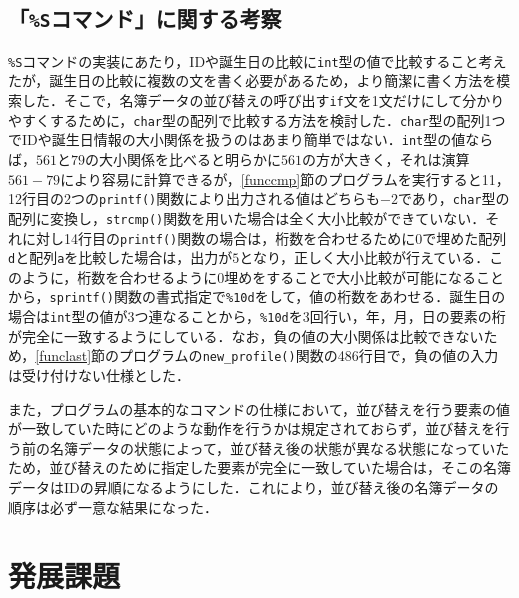 \subsection{「\texttt{\%S}コマンド」に関する考察}

\verb|%S|コマンドの実装にあたり，IDや誕生日の比較に\verb|int|型の値で比較すること考えたが，誕生日の比較に複数の文を書く必要があるため，より簡潔に書く方法を模索した．そこで，名簿データの並び替えの呼び出す\verb|if|文を1文だけにして分かりやすくするために，\verb|char|型の配列で比較する方法を検討した．\verb|char|型の配列1つでIDや誕生日情報の大小関係を扱うのはあまり簡単ではない．\verb|int|型の値ならば，$561$と$79$の大小関係を比べると明らかに$561$の方が大きく，それは演算$561 - 79$により容易に計算できるが，\ref{funccmp}節のプログラムを実行すると11，12行目の2つの\verb|printf()|関数により出力される値はどちらも$-2$であり，\verb|char|型の配列に変換し，\verb|strcmp()|関数を用いた場合は全く大小比較ができていない．それに対し14行目の\verb|printf()|関数の場合は，桁数を合わせるために0で埋めた配列\verb|d|と配列\verb|a|を比較した場合は，出力が$5$となり，正しく大小比較が行えている．このように，桁数を合わせるように0埋めをすることで大小比較が可能になることから，\verb|sprintf()|関数の書式指定で\verb|%10d|をして，値の桁数をあわせる．誕生日の場合は\verb|int|型の値が3つ連なることから，\verb|%10d|を3回行い，年，月，日の要素の桁が完全に一致するようにしている．なお，負の値の大小関係は比較できないため，\ref{funclast}節のプログラムの\verb|new_profile()|関数の486行目で，負の値の入力は受け付けない仕様とした．

また，プログラムの基本的なコマンドの仕様において，並び替えを行う要素の値が一致していた時にどのような動作を行うかは規定されておらず，並び替えを行う前の名簿データの状態によって，並び替え後の状態が異なる状態になっていたため，並び替えのために指定した要素が完全に一致していた場合は，そこの名簿データはIDの昇順になるようにした．これにより，並び替え後の名簿データの順序は必ず一意な結果になった．

\section{発展課題} \label{advancedfunction}

